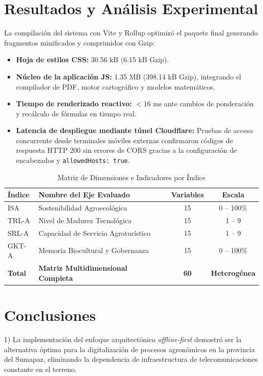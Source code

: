 \documentclass[conference]{IEEEtran}
\begin{document}
\section{Resultados y Análisis Experimental}
La compilación del sistema con Vite y Rollup optimizó el paquete final generando fragmentos minificados y comprimidos con Gzip:
\begin{itemize}
    \item \textbf{Hoja de estilos CSS:} 30.56 kB (6.15 kB Gzip).
    \item \textbf{Núcleo de la aplicación JS:} 1.35 MB (398.14 kB Gzip), integrando el compilador de PDF, motor cartográfico y modelos matemáticos.
    \item \textbf{Tiempo de renderizado reactivo:} $< 16$ ms ante cambios de ponderación y recálculo de fórmulas en tiempo real.
    \item \textbf{Latencia de despliegue mediante túnel Cloudflare:} Pruebas de acceso concurrente desde terminales móviles externas confirmaron códigos de respuesta HTTP 200 sin errores de CORS gracias a la configuración de encabezados y \texttt{allowedHosts: true}.
\end{itemize}

\begin{table}[htbp]
\caption{Matriz de Dimensiones e Indicadores por Índice}
\begin{center}
\begin{tabular}{@{}llcc@{}}
\toprule
\textbf{Índice} & \textbf{Nombre del Eje Evaluado} & \textbf{Variables} & \textbf{Escala} \\
\midrule
ISA & Sostenibilidad Agroecológica & 15 & 0 -- 100\% \\
TRL-A & Nivel de Madurez Tecnológica & 15 & 1 -- 9 \\
SRL-A & Capacidad de Servicio Agroturístico & 15 & 1 -- 9 \\
GKT-A & Memoria Biocultural y Gobernanza & 15 & 0 -- 100\% \\
\midrule
\textbf{Total} & \textbf{Matriz Multidimensional Completa} & \textbf{60} & \textbf{Heterogénea} \\
\bottomrule
\end{tabular}
\label{tab_indicadores}
\end{center}
\end{table}

\section{Conclusiones}
1) La implementación del enfoque arquitectónico \textit{offline-first} demostró ser la alternativa óptima para la digitalización de procesos agronómicos en la provincia del Sumapaz, eliminando la dependencia de infraestructura de telecomunicaciones constante en el terreno.
\end{document}

